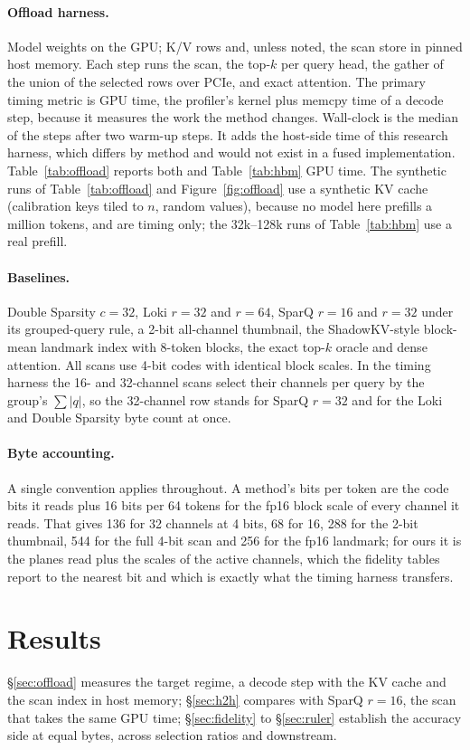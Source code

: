 \documentclass[10pt,twocolumn]{article}
\begin{document}
\paragraph{Offload harness.} Model weights on the GPU; K/V rows and, unless noted, the scan store in pinned host memory. Each step runs the scan, the top-$k$ per query head, the gather of the union of the selected rows over PCIe, and exact attention. The primary timing metric is GPU time, the profiler's kernel plus memcpy time of a decode step, because it measures the work the method changes. Wall-clock is the median of the steps after two warm-up steps. It adds the host-side time of this research harness, which differs by method and would not exist in a fused implementation. Table~\ref{tab:offload} reports both and Table~\ref{tab:hbm} GPU time. The synthetic runs of Table~\ref{tab:offload} and Figure~\ref{fig:offload} use a synthetic KV cache (calibration keys tiled to $n$, random values), because no model here prefills a million tokens, and are timing only; the 32k--128k runs of Table~\ref{tab:hbm} use a real prefill.

\paragraph{Baselines.} Double Sparsity $c=32$, Loki $r=32$ and $r=64$, SparQ $r=16$ and $r=32$ under its grouped-query rule, a 2-bit all-channel thumbnail, the ShadowKV-style block-mean landmark index with 8-token blocks, the exact top-$k$ oracle and dense attention. All scans use 4-bit codes with identical block scales. In the timing harness the 16- and 32-channel scans select their channels per query by the group's $\sum|q|$, so the 32-channel row stands for SparQ $r=32$ and for the Loki and Double Sparsity byte count at once.

\paragraph{Byte accounting.} A single convention applies throughout. A method's bits per token are the code bits it reads plus 16 bits per 64 tokens for the fp16 block scale of every channel it reads. That gives 136 for 32 channels at 4 bits, 68 for 16, 288 for the 2-bit thumbnail, 544 for the full 4-bit scan and 256 for the fp16 landmark; for ours it is the planes read plus the scales of the active channels, which the fidelity tables report to the nearest bit and which is exactly what the timing harness transfers.

\section{Results}
\S\ref{sec:offload} measures the target regime, a decode step with the KV cache and the scan index in host memory; \S\ref{sec:h2h} compares with SparQ $r=16$, the scan that takes the same GPU time; \S\ref{sec:fidelity} to \S\ref{sec:ruler} establish the accuracy side at equal bytes, across selection ratios and downstream.
\end{document}
